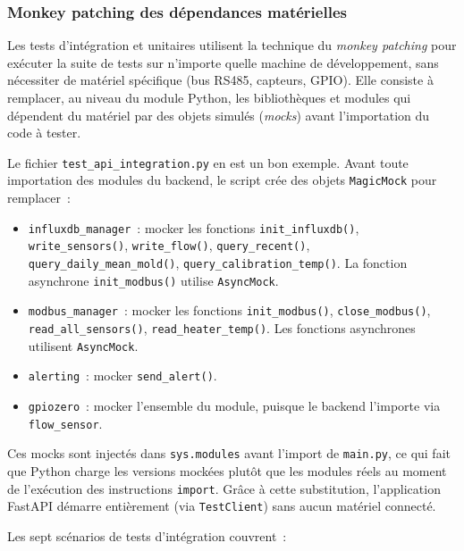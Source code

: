 \subsubsection{Monkey patching des dépendances matérielles}

Les tests d'intégration et unitaires utilisent la technique du \textit{monkey patching} pour exécuter la suite de tests sur n'importe quelle machine de développement, sans nécessiter de matériel spécifique (bus RS485, capteurs, GPIO). Elle consiste à remplacer, au niveau du module Python, les bibliothèques et modules qui dépendent du matériel par des objets simulés (\textit{mocks}) avant l'importation du code à tester.

Le fichier \texttt{test\_api\_integration.py} en est un bon exemple. Avant toute importation des modules du backend, le script crée des objets \texttt{MagicMock} pour remplacer~:

\begin{itemize}
  \item \texttt{influxdb\_manager}~: mocker les fonctions \texttt{init\_influxdb()}, \texttt{write\_sensors()}, \texttt{write\_flow()}, \texttt{query\_recent()}, \texttt{query\_daily\_mean\_mold()}, \texttt{query\_calibration\_temp()}. La fonction asynchrone \texttt{init\_modbus()} utilise \texttt{AsyncMock}.
  \item \texttt{modbus\_manager}~: mocker les fonctions \texttt{init\_modbus()}, \texttt{close\_modbus()}, \texttt{read\_all\_sensors()}, \texttt{read\_heater\_temp()}. Les fonctions asynchrones utilisent \texttt{AsyncMock}.
  \item \texttt{alerting}~: mocker \texttt{send\_alert()}.
  \item \texttt{gpiozero}~: mocker l'ensemble du module, puisque le backend l'importe via \texttt{flow\_sensor}.
\end{itemize}

Ces mocks sont injectés dans \texttt{sys.modules} avant l'import de \texttt{main.py}, ce qui fait que Python charge les versions mockées plutôt que les modules réels au moment de l'exécution des instructions \texttt{import}. Grâce à cette substitution, l'application FastAPI démarre entièrement (via \texttt{TestClient}) sans aucun matériel connecté.

Les sept scénarios de tests d'intégration couvrent~:

